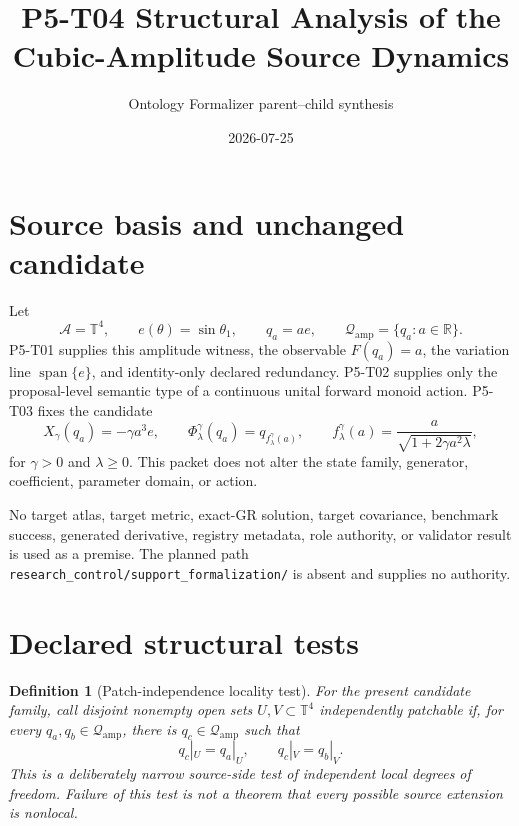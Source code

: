 \documentclass[11pt]{article}
\title{P5-T04 Structural Analysis of the Cubic-Amplitude Source Dynamics}
\author{Ontology Formalizer parent--child synthesis}
\date{2026-07-25}
\newcommand{\Qamp}{\mathcal Q_{\mathrm{amp}}}
\newtheorem{definition}{Definition}
\begin{document}
\maketitle

\begin{center}
\end{center}

\section{Source basis and unchanged candidate}

Let
\[
 \mathcal A=\mathbb T^4,\qquad
 e(\theta)=\sin\theta_1,\qquad
 q_a=a e,\qquad
 \Qamp=\{q_a:a\in\mathbb R\}.
\]
P5-T01 supplies this amplitude witness, the observable \(F(q_a)=a\), the
variation line \(\operatorname{span}\{e\}\), and identity-only declared
redundancy.  P5-T02 supplies only the proposal-level semantic type of a
continuous unital forward monoid action.  P5-T03 fixes the candidate
\[
 X_\gamma(q_a)=-\gamma a^3e,\qquad
 \Phi^\gamma_\lambda(q_a)
 =q_{f^\gamma_\lambda(a)},\qquad
 f^\gamma_\lambda(a)
 =\frac{a}{\sqrt{1+2\gamma a^2\lambda}},
 \label{eq:candidate}
\]
for \(\gamma>0\) and \(\lambda\geq0\).  This packet does not alter the state
family, generator, coefficient, parameter domain, or action.

No target atlas, target metric, exact-GR solution, target covariance,
benchmark success, generated derivative, registry metadata, role authority,
or validator result is used as a premise.  The planned path
\texttt{research\_control/support\_formalization/} is absent and supplies no
authority.

\section{Declared structural tests}

\begin{definition}[Patch-independence locality test]
For the present candidate family, call disjoint nonempty open sets
\(U,V\subset\mathbb T^4\) independently patchable if, for every
\(q_a,q_b\in\Qamp\), there is \(q_c\in\Qamp\) such that
\[
 q_c|_U=q_a|_U,\qquad q_c|_V=q_b|_V.
\]
This is a deliberately narrow source-side test of independent local degrees
of freedom.  Failure of this test is not a theorem that every possible source
extension is nonlocal.
\end{definition}
\end{document}
